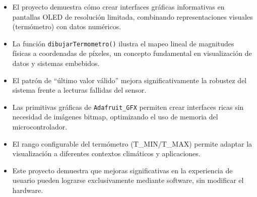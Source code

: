 \documentclass[12pt,a4paper]{article}
\begin{document}
\begin{itemize}
    \item El proyecto demuestra cómo crear interfaces gráficas informativas en pantallas OLED de resolución limitada, combinando representaciones visuales (termómetro) con datos numéricos.
    \item La función \texttt{dibujarTermometro()} ilustra el mapeo lineal de magnitudes físicas a coordenadas de píxeles, un concepto fundamental en visualización de datos y sistemas embebidos.
    \item El patrón de ``último valor válido'' mejora significativamente la robustez del sistema frente a lecturas fallidas del sensor.
    \item Las primitivas gráficas de \texttt{Adafruit\_GFX} permiten crear interfaces ricas sin necesidad de imágenes bitmap, optimizando el uso de memoria del microcontrolador.
    \item El rango configurable del termómetro (T\_MIN/T\_MAX) permite adaptar la visualización a diferentes contextos climáticos y aplicaciones.
    \item Este proyecto demuestra que mejoras significativas en la experiencia de usuario pueden lograrse exclusivamente mediante software, sin modificar el hardware.
\end{itemize}
\end{document}
